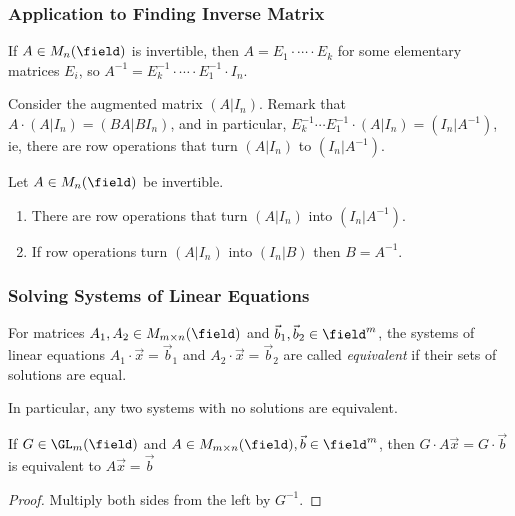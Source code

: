 \subsubsection{Application to Finding Inverse Matrix}

If $A \in M_{n}(\field)$ is invertible, then $A = E_1 \cdot \cdots \cdot E_k$ for some elementary matrices $E_i$, so $A^{-1} = E_k^{-1} \cdot \cdots \cdot E_1^{-1} \cdot I_n$.

Consider the augmented matrix $(A \vert I_n)$. Remark that $A \cdot (A \vert I_n) = (BA \vert BI_n)$, and in particular, $E_k^{-1}\cdots E_1^{-1}\cdot (A \vert I_n) = (I_n \vert A^{-1})$, ie, there are row operations that turn $(A \vert I_n)$ to $(I_n \vert A^{-1})$.

\begin{theorem}
    Let $A \in M_n(\field)$ be invertible.
    \begin{enumerate}
        \item There are row operations that turn $(A \vert I_n)$ into $(I_n \vert A^{-1})$.
        \item If row operations turn $(A \vert I_n)$ into $(I_n\vert B)$ then $B = A^{-1}$.
    \end{enumerate}
\end{theorem}

\subsubsection{Solving Systems of Linear Equations}

\begin{definition}
    For matrices $A_1, A_2 \in M_{m \times n}(\field)$ and $\vec{b}_1, \vec{b}_2 \in \field^m$, the systems of linear equations $A_1 \cdot \vec{x} = \vec{b}_1$ and $A_2 \cdot \vec{x} = \vec{b}_2$ are called \emph{equivalent} if their sets of solutions are equal. 
    
    In particular, any two systems with no solutions are equivalent.
\end{definition}
\begin{proposition}
    If $G \in \GL_m(\field)$ and $A \in M_{m \times n}(\field), \vec{b} \in \field^m$, then $G \cdot A \vec{x} = G \cdot \vec{b}$ is equivalent to $A \vec{x} = \vec{b}$
\end{proposition}

\begin{proof}
    Multiply both sides from the left by $G^{-1}$.
\end{proof}

